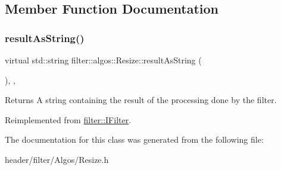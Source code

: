 \subsection{Member Function Documentation}
\mbox{\label{classfilter_1_1algos_1_1_resize_a5f4bc6f31fd5d759f1216ce60b1358b0}} 
\subsubsection{\texorpdfstring{result\+As\+String()}{resultAsString()}}
{\footnotesize\ttfamily virtual std\+::string filter\+::algos\+::\+Resize\+::result\+As\+String (\begin{DoxyParamCaption}{ }\end{DoxyParamCaption})\hspace{0.3cm}{\ttfamily [inline]}, {\ttfamily [private]}, {\ttfamily [virtual]}}

\begin{DoxyReturn}{Returns}
A string containing the result of the processing done by the filter. 
\end{DoxyReturn}


Reimplemented from \hyperlink{classfilter_1_1_i_filter_ab99902b060a6d9edc3452a8c9f85e37e}{filter\+::\+I\+Filter}.



The documentation for this class was generated from the following file\+:\begin{DoxyCompactItemize}
\item 
header/filter/\+Algos/Resize.\+h\end{DoxyCompactItemize}
